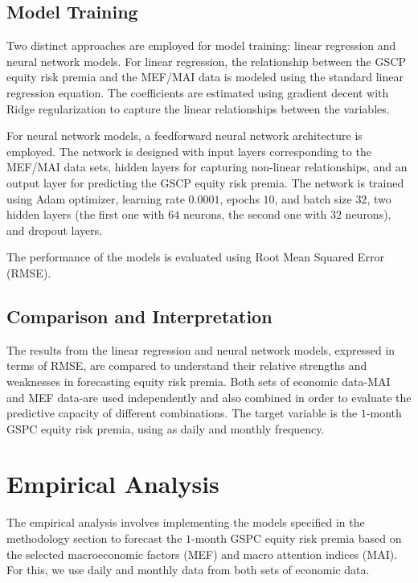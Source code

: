 \documentclass{article}
\begin{document}
\subsection{Model Training}

Two distinct approaches are employed for model training: linear regression and neural network models. For linear regression, the relationship between the GSCP equity risk premia and the MEF/MAI data is modeled using the standard linear regression equation. The coefficients are estimated using gradient decent with Ridge regularization to capture the linear relationships between the variables.

For neural network models, a feedforward neural network architecture is employed. The network is designed with input layers corresponding to the MEF/MAI data sets, hidden layers for capturing non-linear relationships, and an output layer for predicting the GSCP equity risk premia. The network is trained using Adam optimizer, learning rate $0.0001$, epochs $10$, and batch size $32$, two hidden layers (the first one with $64$ neurons, the second one with $32$ neurons), and dropout layers.

The performance of the models is evaluated using Root Mean Squared Error (RMSE).

\subsection{Comparison and Interpretation}

The results from the linear regression and neural network models, expressed in terms of RMSE, are compared to understand their relative strengths and weaknesses in forecasting equity risk premia. Both sets of economic data-MAI and MEF data-are used independently and also combined in order to evaluate the predictive capacity of different combinations. The target variable is the $1$-month GSPC equity risk premia, using as daily and monthly frequency.

\newpage

\section{Empirical Analysis}

The empirical analysis involves implementing the models specified in the methodology section to forecast the $1$-month GSPC equity risk premia based on the selected macroeconomic factors (MEF) and macro attention indices (MAI). For this, we use daily and monthly data from both sets of economic data.
\end{document}
